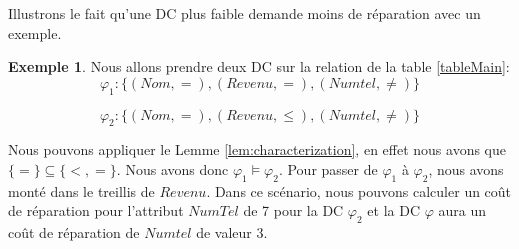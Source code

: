 \documentclass[letterpaper, 12pt]{report}
\theoremstyle{definition}
\newtheorem{myexample}{Exemple}
\begin{document}
 Illustrons le fait qu'une DC plus faible demande moins de réparation avec un exemple. 
\begin{myexample}
Nous allons prendre deux DC sur la relation de la table \ref{tableMain}:
$$ \varphi_1 : \{(Nom,=),(Revenu,=),(Numtel,\neq) \}$$

$$ \varphi_2 : \{(Nom,=),(Revenu,\leq),(Numtel,\neq) \}$$

\end{myexample}



Nous pouvons appliquer le Lemme \ref{lem:characterization}, en effet nous avons que $\{=\} \subseteq \{ <, = \}$. Nous avons donc $\varphi_1 \models \varphi_2$. Pour passer de $\varphi_1$ à $\varphi_2$, nous avons monté dans le treillis de $Revenu$. Dans ce scénario, nous pouvons calculer un coût de réparation pour l'attribut $NumTel$ de 7 pour la DC $\varphi_2$ et la DC $\varphi$ aura un coût de réparation de $Numtel$ de valeur 3.
\end{document}
